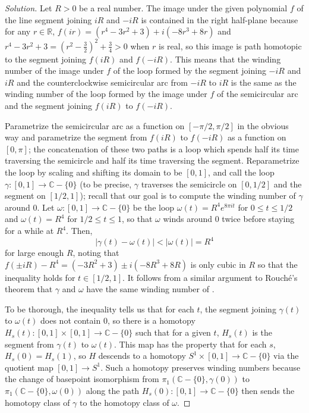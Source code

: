 \documentclass[10pt]{article}
\providecommand{\CC}{\mathbb C}
\providecommand{\RR}{\mathbb R}
\newenvironment{soln}{\begin{proof}[Solution]}{\end{proof}}
\providecommand{\abs}[1]{\left\lvert #1\right\rvert}
\begin{document}
\begin{soln}
    Let $R > 0$ be a real number.
    The image under the given polynomial $f$
    of the line segment joining $iR$ and $-iR$
    is contained in the right half-plane because for any $r\in\RR$,
    $f(ir) = (r^4 - 3r^2 + 3) + i(-8r^3 + 8r)$
    and $r^4 - 3r^2 + 3 = (r^2 - \frac32)^2 + \frac34 > 0$
    when $r$ is real, so this image is path homotopic to
    the segment joining $f(iR)$ and $f(-iR)$.
    This means that the winding number of the image under $f$ of
    the loop formed by the segment joining $-iR$ and $iR$
    and the counterclockwise semicircular arc from $-iR$ to $iR$
    is the same as the winding number of the loop formed by
    the image under $f$ of the semicircular arc and the segment
    joining $f(iR)$ to $f(-iR)$.

    Parametrize the semicircular arc as a function on $[-\pi/2,\pi/2]$
    in the obvious way and parametrize the segment from $f(iR)$ to $f(-iR)$
    as a function on $[0,\pi]$; the concatenation of these two paths
    is a loop which spends half its time traversing the semicircle
    and half its time traversing the segment.
    Reparametrize the loop by scaling and shifting its domain to be $[0,1]$,
    and call the loop $\gamma\colon[0,1]\to\CC-\{0\}$
    (to be precise, $\gamma$ traverses the semicircle on $[0,1/2]$
    and the segment on $[1/2,1]$); recall that our goal is
    to compute the winding number of $\gamma$ around $0$.
    Let $\omega\colon[0,1]\to\CC-\{0\}$ be the loop
    $\omega(t) = R^4e^{8\pi it}$ for $0\le t\le 1/2$
    and $\omega(t) = R^4$ for $1/2\le t\le 1$, so that
    $\omega$ winds around $0$ twice before staying for a while at $R^4$.
    Then,
    \begin{equation*}
	\abs{\gamma(t) - \omega(t)} < \abs{\omega(t)} = R^4
    \end{equation*}
    for large enough $R$, noting that
    $f(\pm iR) - R^4 = (-3R^2 + 3) \pm i(-8R^3 + 8R)$
    is only cubic in $R$ so that the inequality holds for $t\in[1/2,1]$.
    It follows from a similar argument to Rouch\'e's theorem that
    $\gamma$ and $\omega$ have the same winding number of .

    To be thorough, the inequality tells us that
    for each $t$, the segment joining $\gamma(t)$ to $\omega(t)$
    does not contain $0$, so there is a homotopy
    $H_s(t)\colon[0,1]\times[0,1]\to\CC-\{0\}$
    such that for a given $t$, $H_s(t)$ is the segment from $\gamma(t)$
    to $\omega(t)$. This map has the property that for each $s$,
    $H_s(0) = H_s(1)$, so $H$ descends to a homotopy
    $S^1\times[0,1]\to\CC-\{0\}$ via the quotient map
    $[0,1]\to S^1$. Such a homotopy preserves winding numbers
    because the change of basepoint isomorphism
    from $\pi_1(\CC-\{0\},\gamma(0))$ to $\pi_1(\CC-\{0\},\omega(0))$
    along the path $H_s(0)\colon[0,1]\to\CC-\{0\}$
    then sends the homotopy class of $\gamma$
    to the homotopy class of $\omega$.
\end{soln}

\end{document}
